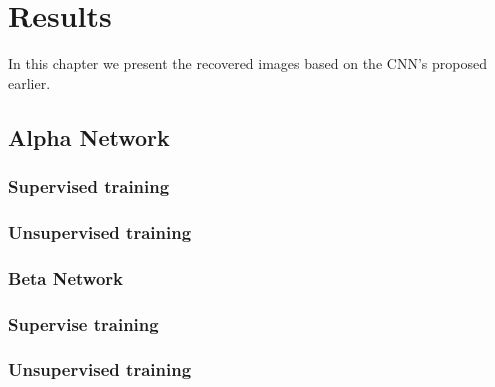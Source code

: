 \chapter{Results}
In this chapter we present the recovered images based on the CNN's proposed earlier.

\section{Alpha Network}

\subsection{Supervised training}

\subsection{Unsupervised training}

\subsection{Beta Network}

\subsection{Supervise training}

\subsection{Unsupervised training}
